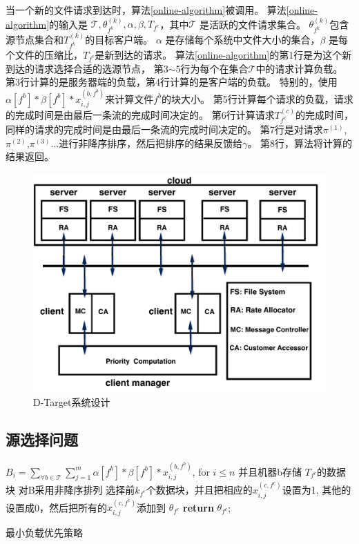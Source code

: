 当一个新的文件请求到达时，算法\ref{online-algorithm}被调用。
算法\ref{online-algorithm}的输入是 $\mathcal{T},\theta_{f^k}^{(k)},\alpha,\beta,T_{f^c}$，其中$\mathcal{T}$ 是活跃的文件请求集合。
$\theta_{f^k}^{(k)}$包含源节点集合和$T^{(k)}_{f^k}$的目标客户端。
$\alpha$ 是存储每个系统中文件大小的集合，$\beta$ 是每个文件的压缩比，$T_{f^c}$是新到达的请求。
算法\ref{online-algorithm}的第1行是为这个新到达的请求选择合适的选源节点，
第3$\sim$5行为每个在集合$\mathcal{T}$中的请求计算负载。
第3行计算的是服务器端的负载，第4行计算的是客户端的负载。
特别的，使用$\alpha[f^b]*\beta[f^b]*x_{i,j}^{(b,f^b)}$来计算文件$f^b$的块大小。
第5行计算每个请求的负载，请求的完成时间是由最后一条流的完成时间决定的。
第6行计算请求$T^{(c)}_{f^c}$的完成时间，同样的请求的完成时间是由最后一条流的完成时间决定的。
第7行是对请求$\pi^{(1)}$,$\pi^{(2)}$,$\pi^{(3)}$...进行非降序排序，然后把排序的结果反馈给$\gamma$。
第8行，算法将计算的结果返回。
\begin{figure}[b]
\begin{center}
\includegraphics [width=0.8\columnwidth] {figures/DTARGET/picture/system/System.pdf}
\caption{D-Target系统设计}
\label{erasure-system-fig}
\end{center}
\end{figure}

\subsection{源选择问题}
\begin{algorithm}
$B_i= \sum_{\forall b \in \mathcal{T}}\sum_{j=1}^{m}\alpha[f^b]*\beta[f^b]*x_{i,j}^{(b,f^b)}$, for $i \le n$ 并且机器b存储 $T_{f^c}$的数据块\;
对B采用非降序排列\;  
选择前$k_{f^c}$个数据块，并且把相应的$x_{i,j}^{(c,f^c)}$设置为1, 其他的设置成0，然后把所有的$x_{i,j}^{(c,f^c)}$添加到 $\theta_{f^c}$\;
\textbf{return} $\theta_{f^c}$;
\caption{最小负载优先策略}
\label{source-selection-algorithm}
\end{algorithm}

